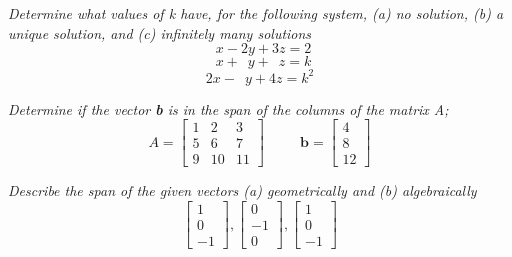 \documentclass[12pt,letterpaper]{hmcpset}
\begin{document}
\begin{solution}

\end{solution}

\newpage

\begin{problem}[2.2.42]
\textit{Determine what values of k have, for the following system, (a) no solution, (b) a unique solution, and (c) infinitely many solutions}
$$ \phantom2 x - 2y+3z=2$$
$$ \phantom2 x +\phantom 2 y+\phantom3z = k$$
$$ 2x - \phantom2 y +4z= k^2$$ 
\end{problem}

\begin{solution}

\end{solution}

\newpage

\begin{problem}[2.3.8]
\textit{Determine if the vector \textbf{b} is in the span of the columns of the matrix A;}
$$ A = \begin{bmatrix}
1&2&3\\5&6&7\\9&10&11
\end{bmatrix}
\phantom{asdas}
\textbf{b}= \begin{bmatrix}
4\\8\\12
\end{bmatrix}
$$
\end{problem}

\begin{solution}

\end{solution}

\newpage

\begin{problem}[2.3.16]
\textit{Describe the span of the given vectors (a) geometrically  and (b) algebraically}
$$ \begin{bmatrix}
1\\0\\-1
\end{bmatrix} \phantom{	},
\begin{bmatrix}
0\\-1\\0
\end{bmatrix} \phantom{	},
\begin{bmatrix}
1\\0\\-1
\end{bmatrix} \phantom{	}
$$
\end{problem}
\end{document}
